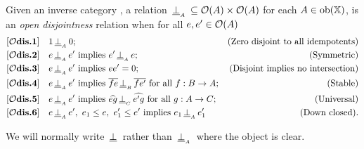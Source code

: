 \begin{definition}\label{def:disjointness_in_open_x}
  Given an inverse category \X, a relation $\,\underline{\perp}_{{}_{A}}\, \subseteq \mathcal{O}({A})\times\mathcal{O}({A})$ for
  each $A \in \mathrm{ob}(\mathbb{X})$, is an \emph{open disjointness} relation when for all $e, e' \in
  \mathcal{O}({A})$
  \begin{align*}
    \axiom{$\mathcal{O}$dis}{1}\quad &1 \ocdperpsub{A} 0; &\text{(Zero disjoint to all idempotents)}\\
    \axiom{$\mathcal{O}$dis}{2}\quad &e \ocdperpsub{A} e' \text{ implies }e' \ocdperpsub{A} e;
    &\text{(Symmetric)}\\
    \axiom{$\mathcal{O}$dis}{3}\quad &e \ocdperpsub{A} e' \text{ implies }e e' = 0; &\text{(Disjoint implies no intersection)}\\
    \axiom{$\mathcal{O}$dis}{4}\quad &e \ocdperpsub{A} e' \text{ implies }\rst{f e} \ocdperpsub{B}
      \rst{f e'}\text{ for all }f:B \to A; &\text{(Stable)}\\
    \axiom{$\mathcal{O}$dis}{5}\quad &e \ocdperpsub{A} e' \text{ implies }\wrg{e g} \ocdperpsub{C}
      \wrg{e' g}\text{ for all }g:A \to C; &\text{(Universal)}\\
    \axiom{$\mathcal{O}$dis}{6}\quad &e \ocdperpsub{A} e',\ e_1 \le e,\ e_1' \le e'
      \text{ implies }e_1 \ocdperpsub{A} e_1' &\text{(Down closed)}.
  \end{align*}
\end{definition}

We will normally write $\,\underline{\perp}\,$ rather than $\,\underline{\perp}_{{}_{A}}\,$ where the object is clear.

